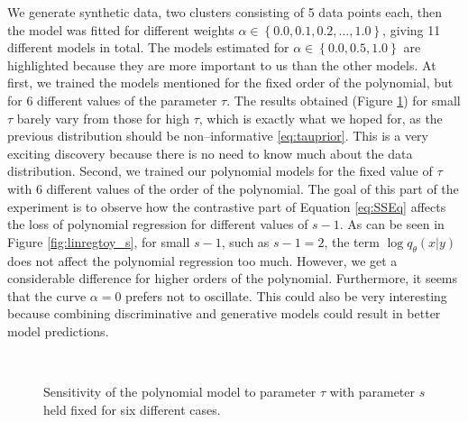We generate synthetic data, two clusters consisting of 5 data points each, then the model was fitted for different weights $\alpha \in \left\{0.0, 0.1, 0.2,\dots,1.0\right\}$, giving 11 different models in total. The models estimated for $\alpha \in \left\{0.0, 0.5, 1.0 \right\}$ are highlighted because they are more important to us than the other models.
At first, we trained the models mentioned for the fixed order of the polynomial, but for 6 different values of the parameter $\tau$. The results obtained (Figure \ref{fig:linregtoy_tau}) for small $\tau$ barely vary from those for high $\tau$, which is exactly what we hoped for, as the previous distribution should be non--informative \eqref{eq:tauprior}.  This is a very exciting discovery because there is no need to know much about the data distribution. Second, we trained our polynomial models for the fixed value of $\tau$ with 6 different values of the order of the polynomial. The goal of this part of the experiment is to observe how the contrastive part of Equation \eqref{eq:SSEq} affects the loss of polynomial regression for different values of $s-1$. As can be seen in Figure \ref{fig:linregtoy_s}, for small $s-1$, such as $s-1 = 2$, the term $\log q_{\theta}\left(x|y\right)$ does not affect the polynomial regression too much. However, we get a considerable difference for higher orders of the polynomial. Furthermore, it seems that the curve $\alpha = 0$ prefers not to oscillate. This could also be very interesting because combining discriminative and generative models could result in better model predictions.    

\begin{figure}[h] 
	\centering
	\
	\
	\caption{Sensitivity of the polynomial model to parameter $\tau$ with parameter $s$ held fixed for six different cases.}%
	\label{fig:linregtoy_tau}%
\end{figure}

